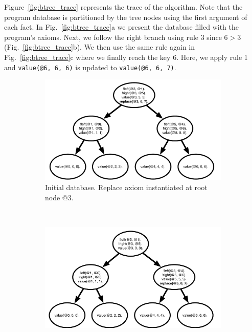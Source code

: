 Figure~\ref{fig:btree_trace} represents the trace of the algorithm. Note that the program database is partitioned
by the tree nodes using the first argument of each fact. In Fig.~\ref{fig:btree_trace}a we present the database
filled with the program's axioms. Next, we follow the right branch using rule 3 since $6 > 3$ (Fig.~\ref{fig:btree_trace}b).
We then use the same rule again in Fig.~\ref{fig:btree_trace}c where we finally reach the key 6. Here, we apply rule 1 and
\texttt{value(@6, 6, 6)} is updated to \texttt{value(@6, 6, 7)}.

\begin{figure}[]
        \centering
        \begin{subfigure}[b]{0.45\textwidth}
                \includegraphics[width=\textwidth]{btree_trace1}
                \caption{Initial database. Replace axiom instantiated at root node $@3$.}
                \label{fig:btree_trace1}
        \end{subfigure}%
        ~
        \begin{subfigure}[b]{0.45\textwidth}
                \includegraphics[width=\textwidth]{btree_trace2}

\end{subfigure}
\end{figure}
